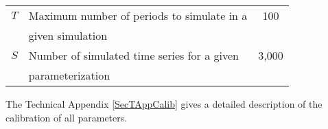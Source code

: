 \documentclass[letterpaper,12pt]{article}
\theoremstyle{definition}
\begin{document}
\begin{spacing}{1.5}
\begin{table}[htbp]
\begin{threeparttable}
\begin{tabular}{>{\small}c >{\small}l >{\small}c}
          $T$ & Maximum number of periods to simulate in a & 100 \\
              & \quad given simulation & \\
          $S$ & Number of simulated time series for a given & 3,000 \\
              & \quad parameterization & \\
          \hline\hline
      \end{tabular}
      \begin{tablenotes}
          \scriptsize{\item[]The Technical Appendix \ref{SecTAppCalib} gives a detailed description of the calibration of all parameters.}
      \end{tablenotes}
      \end{threeparttable}
  \end{table}


\end{spacing}
\end{document}
